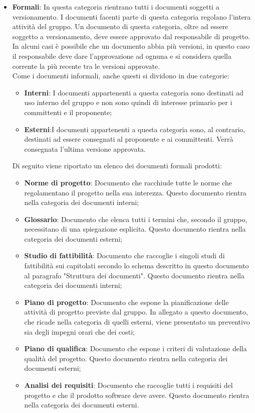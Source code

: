 \documentclass[../norme_di_progetto.tex]{subfiles}
\begin{document}
\begin{itemize}
    \item \textbf{Formali}: In questa categoria rientrano tutti i documenti soggetti a versionamento. I documenti facenti parte di questa categoria regolano l'intera attività del gruppo. Un documento di questa categoria, oltre ad essere soggetto a versionamento, deve essere approvato dal responsabile di progetto. In alcuni casi è possibile che un documento abbia più versioni, in questo caso il responsabile deve dare l'approvazione ad ognuna e si considera quella corrente la più recente tra le versioni approvate.\\
    Come i documenti informali, anche questi si dividono in due categorie:
    \begin{itemize}
        \item \textbf{Interni}: I documenti appartenenti a questa categoria sono destinati ad uso interno del gruppo e non sono quindi di interesse primario per i committenti e il proponente;
        \item \textbf{Esterni}:I documenti appartenenti a questa categoria sono, al contrario, destinati ad essere consegnati al proponente e ai committenti. Verrà consegnata l'ultima versione approvata.
    \end{itemize}
    Di seguito viene riportato un elenco dei documenti formali prodotti:
    \begin{itemize}
        \item \textbf{Norme di progetto}: Documento che racchiude tutte le norme che regolamentano il progetto nella sua interezza. Questo documento rientra nella categoria dei documenti interni;
        \item \textbf{Glossario}: Documento che elenca tutti i termini che, secondo il gruppo, necessitano di una spiegazione esplicita. Questo documento rientra nella categoria dei documenti esterni;
        \item \textbf{Studio di fattibilità}: Documento che raccoglie i singoli studi di fattibilità sui capitolati secondo lo schema descritto in questo documento al paragrafo "Struttura dei documenti". Questo documento rientra nella categoria dei documenti interni;
        \item \textbf{Piano di progetto}: Documento che espone la pianificazione delle attività di progetto previste dal gruppo. In allegato a questo documento, che ricade nella categoria di quelli esterni, viene presentato un preventivo sia degli impegni orari che dei costi;
        \item \textbf{Piano di qualifica}: Documento che espone i criteri di valutazione della qualità del progetto. Questo documento rientra nella categoria dei documenti esterni;
        \item \textbf{Analisi dei requisiti}: Documento che raccoglie tutti i requisiti del progetto e che il prodotto software deve avere. Questo documento rientra nella categoria dei documenti esterni.
  \end{itemize}
  
\end{itemize}
\end{document}
